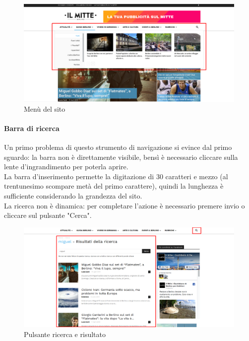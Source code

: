 \vspace{30pt}
\begin{figure}[htbp]
\begin{center}
\includegraphics[width=35em]{img/menu}
\caption{Menù del sito}
\end{center}
\end{figure}
\vspace{30pt}

\paragraph*{Barra di ricerca}

Un primo problema di questo strumento di navigazione si evince dal primo sguardo: la barra non è direttamente visibile, bensì è necessario cliccare sulla lente d'ingrandimento per poterla aprire. \\
La barra d'inserimento permette la digitazione di 30 caratteri e mezzo (al trentunesimo scompare metà del primo carattere), quindi la lunghezza è sufficiente considerando la grandezza del sito. \\
La ricerca non è dinamica: per completare l'azione è necessario premere invio o cliccare sul pulsante "Cerca". 


\vspace{30pt}
\begin{figure}[htbp]
\begin{center}
\includegraphics[width=35em]{img/ricerca}
\caption{Pulsante ricerca e risultato}
\end{center}
\end{figure}
\vspace{30pt}

